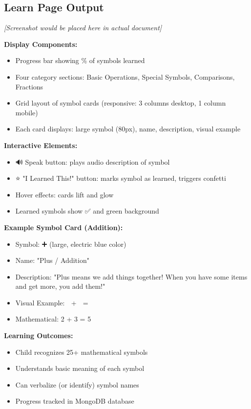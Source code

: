 \documentclass[12pt, a4paper]{article}
\begin{document}
\subsection{Learn Page Output}

\begin{tcolorbox}[colback=gray!5, colframe=gray!50, title=\textbf{Math Symbol Learning Interface}]
\textit{[Screenshot would be placed here in actual document]}

\textbf{Display Components:}
\begin{itemize}
    \item Progress bar showing \% of symbols learned
    \item Four category sections: Basic Operations, Special Symbols, Comparisons, Fractions
    \item Grid layout of symbol cards (responsive: 3 columns desktop, 1 column mobile)
    \item Each card displays: large symbol (80px), name, description, visual example
\end{itemize}

\textbf{Interactive Elements:}
\begin{itemize}
    \item 🔊 Speak button: plays audio description of symbol
    \item ⭐ "I Learned This!" button: marks symbol as learned, triggers confetti
    \item Hover effects: cards lift and glow
    \item Learned symbols show ✅ and green background
\end{itemize}

\textbf{Example Symbol Card (Addition):}
\begin{itemize}
    \item Symbol: ➕ (large, electric blue color)
    \item Name: "Plus / Addition"
    \item Description: "Plus means we add things together! When you have some items and get more, you add them!"
    \item Visual Example: 🍎 + 🍎 = 🍎🍎
    \item Mathematical: 2 + 3 = 5
\end{itemize}

\textbf{Learning Outcomes:}
\begin{itemize}
    \item Child recognizes 25+ mathematical symbols
    \item Understands basic meaning of each symbol
    \item Can verbalize (or identify) symbol names
    \item Progress tracked in MongoDB database
\end{itemize}
\end{tcolorbox}
\end{document}
